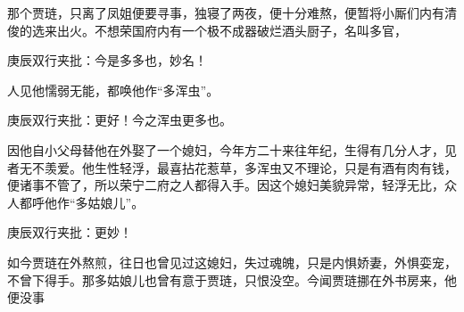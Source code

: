 \begin{parag}
    那个贾琏，只离了凤姐便要寻事，独寝了两夜，便十分难熬，便暂将小厮们内有清俊的选来出火。不想荣国府内有一个极不成器破烂酒头厨子，名叫多官，\begin{note}庚辰双行夹批：今是多多也，妙名！\end{note}人见他懦弱无能，都唤他作“多浑虫”。\begin{note}庚辰双行夹批：更好！今之浑虫更多也。\end{note}因他自小父母替他在外娶了一个媳妇，今年方二十来往年纪，生得有几分人才，见者无不羡爱。他生性轻浮，最喜拈花惹草，多浑虫又不理论，只是有酒有肉有钱，便诸事不管了，所以荣宁二府之人都得入手。因这个媳妇美貌异常，轻浮无比，众人都呼他作“多姑娘儿”。\begin{note}庚辰双行夹批：更妙！\end{note}如今贾琏在外熬煎，往日也曾见过这媳妇，失过魂魄，只是内惧娇妻，外惧娈宠，不曾下得手。那多姑娘儿也曾有意于贾琏，只恨没空。今闻贾琏挪在外书房来，他便没事
\end{parag}

